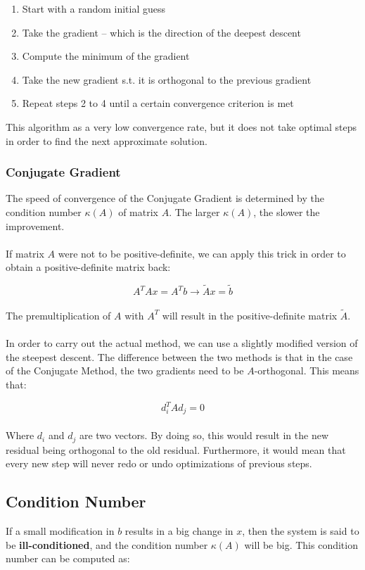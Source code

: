 \documentclass{article}
\begin{document}
\begin{enumerate}
	\item Start with a random initial guess
	\item Take the gradient -- which is the direction of the deepest descent
	\item Compute the minimum of the gradient
	\item Take the new gradient s.t. it is orthogonal to the previous gradient
	\item Repeat steps 2 to 4 until a certain convergence criterion is met
\end{enumerate}
This algorithm as a very low convergence rate, but it does not take optimal steps in order to find the next approximate solution.

\subsubsection{Conjugate Gradient}
The speed of convergence of the Conjugate Gradient is determined by the condition number $\kappa(A)$ of matrix $A$. The larger $\kappa(A)$, the slower the improvement. \\ \\
If matrix $A$ were not to be positive-definite, we can apply this trick in order to obtain a positive-definite matrix back:

\[ A^TAx = A^Tb \rightarrow \tilde{A}x = \tilde{b} \] \\
The premultiplication of $A$ with $A^T$ will result in the positive-definite matrix $\tilde{A}$. \\ \\
In order to carry out the actual method, we can use a slightly modified version of the steepest descent. The difference between the two methods is that in the case of the Conjugate Method, the two gradients need to be $A$-orthogonal. This means that:

\[ d^T_i A d_j = 0 \] \\
Where $d_i$ and $d_j$ are two vectors. By doing so, this would result in the new residual being orthogonal to the old residual. Furthermore, it would mean that every new step will never redo or undo optimizations of previous steps.

\subsection{Condition Number}
If a small modification in $b$ results in a big change in $x$, then the system is said to be \textbf{ill-conditioned}, and the condition number $\kappa(A)$ will be big. This condition number can be computed as:
\end{document}
